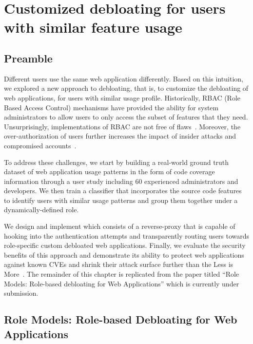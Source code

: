 \chapter{Customized debloating for users with similar feature usage}
\label{chap:dbltr}

\section*{Preamble}
Different users use the same web application differently. 
Based on this intuition, we explored a new approach to debloating, that is, to customize the debloating of web applications, for users with similar usage profile. 
Historically, RBAC (Role Based Access Control) mechanisms have provided the ability for system administrators to allow users to only access the subset of features that they need. 
Unsurprisingly, implementations of RBAC are not free of flaws~\cite{doupe2011fear, dalton2009nemesis, wpfilemanager}. 
Moreover, the over-authorization of users further increases the impact of insider attacks and compromised accounts~\cite{twitterviphack, oktahack}.

To address these challenges, we start by building a real-world ground truth dataset of web application usage patterns in the form of code coverage information through a user study including 60 experienced administrators and developers. 
We then train a classifier that incorporates the source code features to identify users with similar usage patterns and group them together under a dynamically-defined role. 

We design and implement \sys{} which consists of a reverse-proxy that is capable of hooking into the authentication attempts and transparently routing users towards role-specific custom debloated web applications. 
Finally, we evaluate the security benefits of this approach and demonstrate its ability to protect web applications against known CVEs and shrink their attack surface further than the Less is More~\cite{azad2019less}. 
The remainder of this chapter is replicated from the paper titled ``Role Models: Role-based debloating for Web Applications'' which is currently under submission. 

\section*{Role Models: Role-based Debloating for Web Applications}

